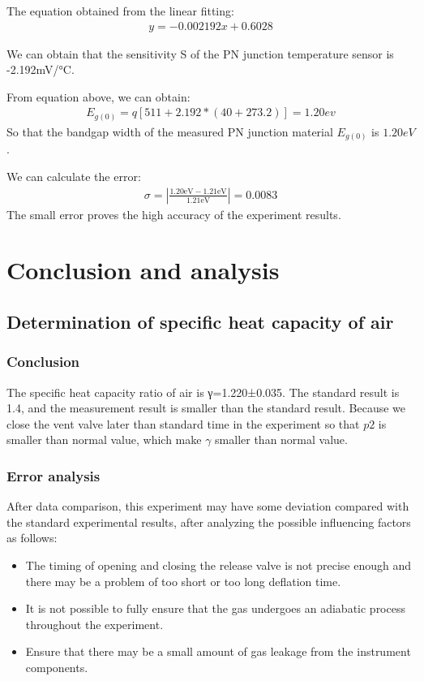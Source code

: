 \documentclass[UTF8]{article}
\begin{document}
       The equation obtained from the linear fitting:
       \begin{eqnarray}
       y = -0.002192 x + 0.6028
       \end{eqnarray}     
      
      We can obtain that the sensitivity S of the PN junction temperature sensor is -2.192mV/°C.     

	From equation above, we can obtain:
	\begin{eqnarray}
	E_{g(0)} = q[511+2.192*(40+273.2)] = 1.20ev
	\end{eqnarray}
	So that the bandgap width of the measured PN junction material  $E_{g(0)}$ is $1.20eV$.
	
	We can calculate the error:
	\begin{eqnarray}
	\sigma=\left|\frac{1.20 \mathrm{eV}-1.21 \mathrm{eV}}{1.21 \mathrm{eV}}\right|=0.0083
	\end{eqnarray}
	The small error proves the high accuracy of the experiment results.
	
	\section{Conclusion and analysis}
	\subsection{Determination of specific heat capacity of air}
	\subsubsection{Conclusion}
	
	The specific heat capacity ratio of air is γ=1.220±0.035. The standard result is 1.4, and the measurement result is smaller than the standard result. Because we close the vent valve later than standard time in the experiment so that $p2$ is smaller than normal value, which make $\gamma$ smaller than normal value.
	
	\subsubsection{Error analysis}
	After data comparison, this experiment may have some deviation compared with the standard experimental results, after analyzing the possible influencing factors as follows:
	\begin{itemize}
	\item The timing of opening and closing the release valve is not precise enough and there may be a problem of too short or too long deflation time.
	\item It is not possible to fully ensure that the gas undergoes an adiabatic process throughout the experiment.
	\item Ensure that there may be a small amount of gas leakage from the instrument components.
	\end{itemize}
	
\end{document}

